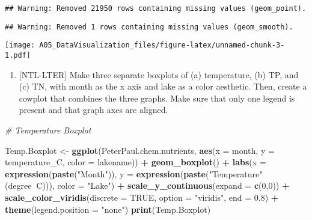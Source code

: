 \documentclass[]{article}
\newenvironment{Shaded}{\begin{snugshade}}{\end{snugshade}}
\newcommand{\KeywordTok}[1]{\textcolor[rgb]{0.13,0.29,0.53}{\textbf{#1}}}
\newcommand{\DataTypeTok}[1]{\textcolor[rgb]{0.13,0.29,0.53}{#1}}
\newcommand{\DecValTok}[1]{\textcolor[rgb]{0.00,0.00,0.81}{#1}}
\newcommand{\FloatTok}[1]{\textcolor[rgb]{0.00,0.00,0.81}{#1}}
\newcommand{\StringTok}[1]{\textcolor[rgb]{0.31,0.60,0.02}{#1}}
\newcommand{\CommentTok}[1]{\textcolor[rgb]{0.56,0.35,0.01}{\textit{#1}}}
\newcommand{\OtherTok}[1]{\textcolor[rgb]{0.56,0.35,0.01}{#1}}
\newcommand{\OperatorTok}[1]{\textcolor[rgb]{0.81,0.36,0.00}{\textbf{#1}}}
\newcommand{\NormalTok}[1]{#1}
\providecommand{\tightlist}{%
  \setlength{\itemsep}{0pt}\setlength{\parskip}{0pt}}
\begin{document}
\begin{verbatim}
## Warning: Removed 21950 rows containing missing values (geom_point).
\end{verbatim}

\begin{verbatim}
## Warning: Removed 1 rows containing missing values (geom_smooth).
\end{verbatim}

\texttt{[image: A05\_DataVisualization\_files/figure-latex/unnamed-chunk-3-1.pdf]}

\begin{enumerate}
\def\labelenumi{\arabic{enumi}.}
\setcounter{enumi}{4}
\tightlist
\item
  {[}NTL-LTER{]} Make three separate boxplots of (a) temperature, (b)
  TP, and (c) TN, with month as the x axis and lake as a color
  aesthetic. Then, create a cowplot that combines the three graphs. Make
  sure that only one legend is present and that graph axes are aligned.
\end{enumerate}

\begin{Shaded}
\begin{Highlighting}[]
\CommentTok{# Temperature Boxplot}

\NormalTok{Temp.Boxplot <-}\StringTok{ }
\StringTok{  }\KeywordTok{ggplot}\NormalTok{(PeterPaul.chem.nutrients, }\KeywordTok{aes}\NormalTok{(}\DataTypeTok{x =}\NormalTok{ month, }\DataTypeTok{y =}\NormalTok{ temperature_C, }\DataTypeTok{color =}\NormalTok{ lakename)) }\OperatorTok{+}
\StringTok{  }\KeywordTok{geom_boxplot}\NormalTok{() }\OperatorTok{+}
\StringTok{  }\KeywordTok{labs}\NormalTok{(}\DataTypeTok{x =} \KeywordTok{expression}\NormalTok{(}\KeywordTok{paste}\NormalTok{(}\StringTok{"Month"}\NormalTok{)),}
       \DataTypeTok{y =} \KeywordTok{expression}\NormalTok{(}\KeywordTok{paste}\NormalTok{(}\StringTok{"Temperature"}\NormalTok{ (degree}\OperatorTok{~}\NormalTok{C))), }\DataTypeTok{color =} \StringTok{"Lake"}\NormalTok{) }\OperatorTok{+}
\StringTok{  }\KeywordTok{scale_y_continuous}\NormalTok{(}\DataTypeTok{expand =} \KeywordTok{c}\NormalTok{(}\DecValTok{0}\NormalTok{,}\DecValTok{0}\NormalTok{)) }\OperatorTok{+}\StringTok{ }
\StringTok{  }\KeywordTok{scale_color_viridis}\NormalTok{(}\DataTypeTok{discrete =} \OtherTok{TRUE}\NormalTok{, }\DataTypeTok{option =} \StringTok{"viridis"}\NormalTok{, }\DataTypeTok{end =} \FloatTok{0.8}\NormalTok{) }\OperatorTok{+}
\StringTok{  }\KeywordTok{theme}\NormalTok{(}\DataTypeTok{legend.position =} \StringTok{"none"}\NormalTok{)}
\KeywordTok{print}\NormalTok{(Temp.Boxplot)}
\end{Highlighting}
\end{Shaded}
\end{document}
